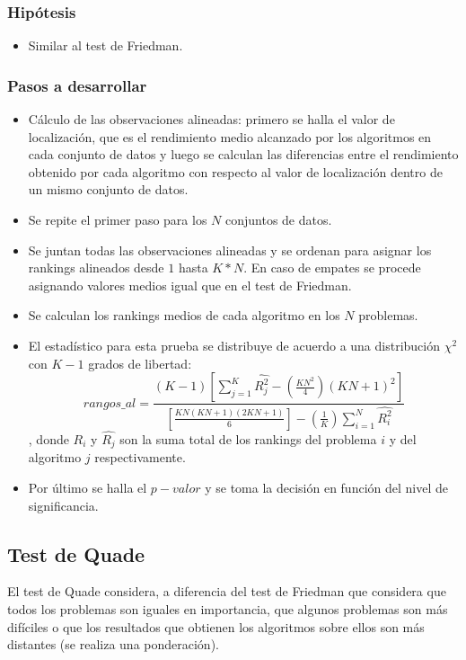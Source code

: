 \subsubsection{Hipótesis}
\begin{itemize}
\item Similar al test de Friedman.
\end{itemize}

\subsubsection{Pasos a desarrollar}
\begin{itemize}
\item Cálculo de las observaciones alineadas: primero se halla el valor de localización, que es el rendimiento
medio alcanzado por los algoritmos en cada conjunto de datos y luego se calculan las diferencias entre el
rendimiento obtenido por cada algoritmo con respecto al valor de localización dentro de un mismo conjunto de
datos.
\item Se repite el primer paso para los $N$ conjuntos de datos.
\item Se juntan todas las observaciones alineadas y se ordenan para asignar los rankings alineados desde $1$
hasta $K*N$. En caso de empates se procede asignando valores medios igual que en el test de Friedman.
\item Se calculan los rankings medios de cada algoritmo en los $N$ problemas.
\item El estadístico para esta prueba se distribuye de acuerdo a una distribución $\chi^2$ con $K-1$ grados de
libertad:
\[ rangos\_al = \frac{(K-1) \left[ \sum_{j=1}^{K} \hat{R_{j}^{2}} - (\frac{KN^2}{4})(KN+1)^2 \right]}
{\left[\frac{KN(KN+1)(2KN+1)}{6}\right] - (\frac{1}{K}) \sum_{i=1}^{N} \hat{R_{i}^{2}}} \]
, donde $\hat{R_{i}}$ y $\hat{R_{j}}$ son la suma total de los rankings del problema $i$ y del algoritmo $j$
respectivamente.
\item Por último se halla el $p-valor$ y se toma la decisión en función del nivel de significancia.
\end{itemize}


\subsection{Test de Quade}
El test de Quade considera, a diferencia del test de Friedman que considera que todos los problemas son
iguales en importancia, que algunos problemas son más difíciles o que los resultados que obtienen los algoritmos
sobre ellos son más distantes (se realiza una ponderación).

